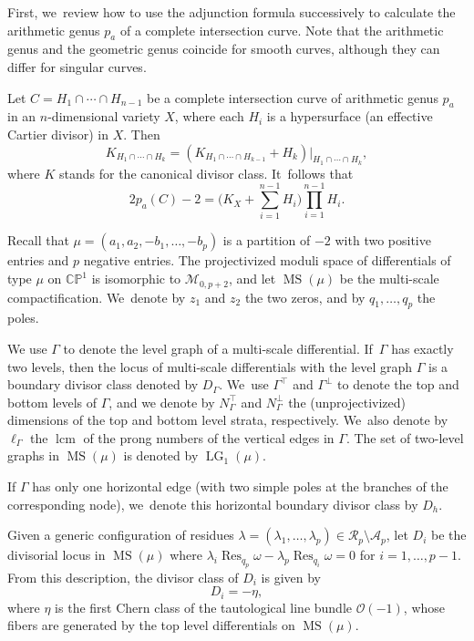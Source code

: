 \documentclass[JEP,XML,SOM,Unicode,NoFloatCountersInSection,published]{cedram}
\DeclareMathOperator{\lcm}{lcm}
\DeclareMathOperator\LG{LG}
\DeclareMathOperator\MS{MS}
\DeclareMathOperator\Res{Res}
\theoremstyle{definition}
\begin{document}
First, we~review how to use the adjunction formula successively to calculate the arithmetic genus $p_a$ of a complete intersection curve. Note that the arithmetic genus and the geometric genus coincide for smooth curves, although they can differ for singular curves.

Let $C = H_1\cap \cdots \cap H_{n-1}$ be a complete intersection curve of arithmetic genus $p_a$ in an $n$-dimensional variety $X$, where each $H_i$ is a hypersurface (\ie an effective Cartier divisor) in $X$. Then
\[
K_{H_1\cap\cdots \cap H_k} = \left(K_{H_1\cap \cdots \cap H_{k-1}} + H_k\right)|_{H_1\cap \cdots \cap H_{k}},
\]
where $K$ stands for the canonical divisor class. It~follows that\vspace*{-3pt}
\[
2p_a(C)-2 = \biggl(K_X + \sum_{i=1}^{n-1} H_i \biggr) \prod_{i=1}^{n-1} H_i.
\]

Recall that $\mu = (a_1, a_2, -b_1, \ldots, -b_p)$ is a partition of $-2$ with two positive entries and $p$ negative entries. The projectivized moduli space of differentials of type $\mu$ on $\mathbb{CP}^1$ is isomorphic to $\mathcal M_{0,p+2}$, and let $\MS(\mu)$ be the multi-scale compactification. We~denote by $z_1$ and $z_2$ the two zeros, and by $q_1,\ldots,q_p$ the poles.

We use $\Gamma$ to denote the level graph of a multi-scale differential. If~$\Gamma$ has exactly two levels, then the locus of multi-scale differentials with the level graph $\Gamma$ is a boundary divisor class denoted by $D_\Gamma$. We~use $\Gamma^{\top}$ and $\Gamma^{\bot}$ to denote the top and bottom levels of $\Gamma$, and we denote by $N_{\Gamma}^{\top}$ and $N_{\Gamma}^{\bot}$ the (unprojectivized) dimensions of the top and bottom level strata, respectively. We~also denote by $\ell_\Gamma$ the $\lcm$ of the prong numbers of the vertical edges in $\Gamma$. The set of two-level graphs in $\MS(\mu)$ is denoted by $\LG_1(\mu)$.

If $\Gamma$ has only one horizontal edge (\ie with two simple poles at the branches of the corresponding node), we~denote this horizontal boundary divisor class by $D_h$.

Given a generic configuration of residues $\lambda = (\lambda_{1}, \ldots, \lambda_{p})\in \mathcal{R}_{p} \setminus \mathcal{A}_{p}$, let $D_i$ be the divisorial locus in $\MS(\mu)$
where $\lambda_i \Res_{q_p}\omega - \lambda_{p} \Res_{q_i}\omega = 0$ for $i=1,\ldots, p-1$. From this description, the divisor class of $D_i$ is given by\vspace*{-3pt}\enlargethispage{\baselineskip}
\[
D_i = -\eta,
\]
where $\eta$ is the first Chern class of the tautological line bundle $\mathcal O(-1)$, whose fibers are generated by the top level differentials on $\MS(\mu)$.
\end{document}
